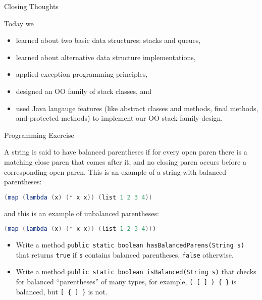 \documentclass{beamer}
\begin{document}
\begin{frame}[fragile]{Closing Thoughts}


Today we
\begin{itemize}
\item learned about two basic data structures: stacks and queues,
\item learned about alternative data structure implementations,
\item applied exception programming principles,
\item designed an OO family of stack classes, and
\item used Java langauge features (like abstract classes and methods, final methods, and protected methods) to implement our OO stack family design.
\end{itemize}


\end{frame}

\begin{frame}[fragile]{Programming Exercise}

A string is said to have balanced parentheses if for every open paren there is a matching close paren that comes after it, and no closing paren occurs before a corresponding open paren.  This is an example of a string with balanced parentheses:
\begin{lstlisting}[language=Java]
(map (lambda (x) (* x x)) (list 1 2 3 4))
\end{lstlisting}
and this is an example of unbalanced parentheses:
\begin{lstlisting}[language=Java]
(map (lambda (x) (* x x)) (list 1 2 3 4)))
\end{lstlisting}
\vspace{-.05in}
\begin{itemize}
\item Write a method {\tt public static boolean hasBalancedParens(String s)} that returns {\tt true} if {\tt s} contains balanced parentheses, {\tt false} otherwise.
\item Write a method {\tt public static boolean isBalanced(String s)} that checks for balanced ``parentheses'' of many types, for example, {\tt ( [ ] ) \{ \}} is balanced, but {\tt  [ \{ ] \}} is not.
\end{itemize}


\end{frame}








\end{document}
